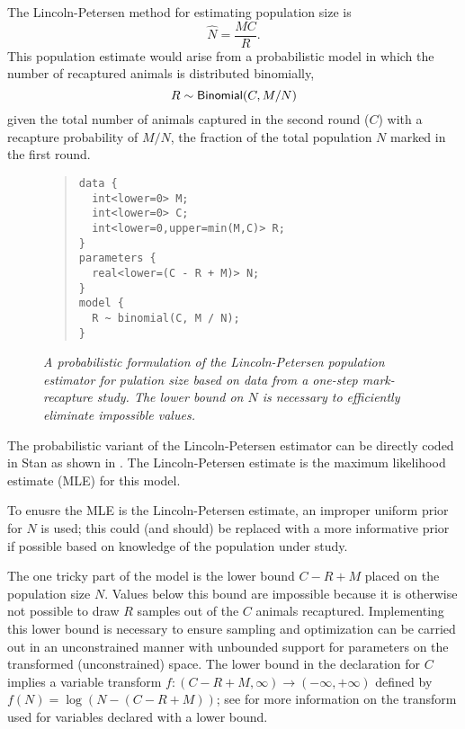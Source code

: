The Lincoln-Petersen \citep{Lincoln:1930,Petersen:1896} method for
estimating population size is
%
\[
\hat{N} = \frac{M C}{R}.
\]
%
This population estimate would arise from a probabilistic model in
which the number of recaptured animals is distributed binomially,
\[
R \sim \mbox{\sf Binomial}(C, M / N)
\]
given the total number of animals captured in the second round ($C$)
with a recapture probability of $M/N$, the fraction of the total
population $N$ marked in the first round.

%
\begin{figure}
\begin{quote}\small
\begin{Verbatim}
data {
  int<lower=0> M;
  int<lower=0> C;
  int<lower=0,upper=min(M,C)> R;
}
parameters {
  real<lower=(C - R + M)> N;
}
model {
  R ~ binomial(C, M / N);
}
\end{Verbatim}
\end{quote}
\vspace*{-6pt}
\caption{\small\it A probabilistic formulation of the Lincoln-Petersen
population estimator for pulation size based on data from a one-step
mark-recapture study.  The lower bound on $N$ is necessary to
efficiently eliminate impossible values.}%
\label{lincoln-petersen-model.figure}
\end{figure}
%
The probabilistic variant of the Lincoln-Petersen estimator can be
directly coded in Stan as shown in .
The Lincoln-Petersen estimate is the maximum likelihood estimate (MLE)
for this model.

To enusre the MLE is the Lincoln-Petersen estimate, an improper
uniform prior for $N$ is used; this could (and should) be replaced
with a more informative prior if possible based on knowledge of the
population under study.

The one tricky part of the model is the lower bound $C - R + M$ placed
on the population size $N$.  Values below this bound are impossible
because it is otherwise not possible to draw $R$ samples out of the
$C$ animals recaptured.  Implementing this lower bound is necessary to
ensure sampling and optimization can be carried out in an
unconstrained manner with unbounded support for parameters on the
transformed (unconstrained) space.  The lower bound in the declaration
for $C$ implies a variable transform $f : (C-R+M,\infty) \rightarrow
(-\infty,+\infty)$ defined by $f(N) = \log(N - (C - R + M))$; see
 for more information on the
transform used for variables declared with a lower bound.

